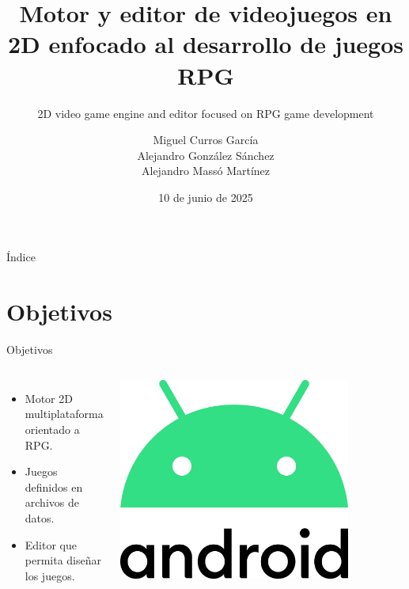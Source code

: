 \documentclass[aspectratio=169]{beamer}
\title[Motor y editor de videojuegos en 2D enfocado al desarrollo de juegos RPG]{Motor y editor de videojuegos en 2D enfocado al desarrollo de juegos RPG}
\subtitle{2D video game engine and editor focused on RPG game development}
\author[Miguel Curros, Alejandro González y Alejandro Massó]{Miguel Curros García\\ Alejandro González Sánchez\\ Alejandro Massó Martínez}
\date{10 de junio de 2025}
\begin{document}
\frame{\titlepage}

\begin{frame}{Índice}
	\tableofcontents
\end{frame}

\section{Objetivos}
\begin{frame}{Objetivos}
	\begin{columns}
		\begin{itemize}
			\item Motor 2D multiplataforma orientado a RPG.
			\item Juegos definidos en archivos de datos.
			\item Editor que permita diseñar los juegos.
		\end{itemize}
		\includegraphics[width=0.8\textwidth]{imgs/objetivos/android.pdf}
	\end{columns}
\end{frame}
\end{document}
